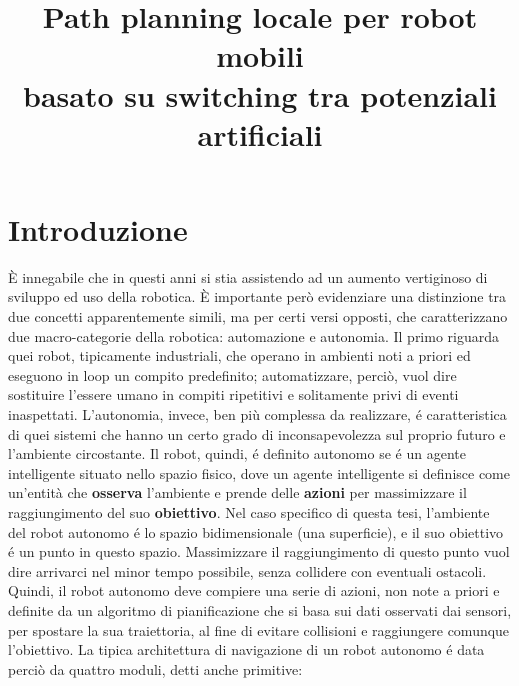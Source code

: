 \documentclass[14pt,a4paper]{extarticle}
\title{Path planning locale per robot mobili \\ basato su switching tra potenziali artificiali}
\author{}
\date{}
\begin{document}
\maketitle \newpage %
\tableofcontents \newpage %

\section{Introduzione}
È innegabile che in questi anni si stia assistendo ad un aumento vertiginoso di sviluppo ed uso della robotica. È importante però evidenziare una distinzione tra due concetti apparentemente simili, ma per certi versi opposti, che caratterizzano due macro-categorie della robotica: automazione e autonomia. Il primo riguarda quei robot, tipicamente industriali, che operano in ambienti noti a priori ed eseguono in loop un compito predefinito; automatizzare, perciò, vuol dire sostituire l'essere umano in compiti ripetitivi e solitamente privi di eventi inaspettati. L'autonomia, invece, ben più complessa da realizzare, é caratteristica di quei sistemi che hanno un certo grado di inconsapevolezza sul proprio futuro e l'ambiente circostante.  Il robot, quindi, é definito autonomo se é un agente intelligente situato nello spazio fisico, dove un agente intelligente si definisce come un'entità che \textbf{osserva} l'ambiente e prende delle \textbf{azioni} per massimizzare il raggiungimento del suo \textbf{obiettivo}\cite{murphy}. Nel caso specifico di questa tesi, l'ambiente del robot autonomo é lo spazio bidimensionale (una superficie), e il suo obiettivo é un punto in questo spazio. Massimizzare il raggiungimento di questo punto vuol dire arrivarci nel minor tempo possibile, senza collidere con eventuali ostacoli. Quindi, il robot autonomo deve compiere una serie di azioni, non note a priori e definite da un algoritmo di pianificazione che si basa sui dati osservati dai sensori, per spostare la sua traiettoria, al fine di evitare collisioni e raggiungere comunque l'obiettivo. La tipica architettura di navigazione di un robot autonomo é data perciò da quattro moduli, detti anche primitive: 
\end{document}
